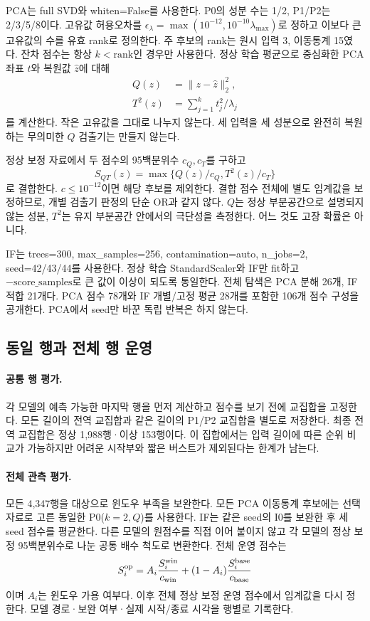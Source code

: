 \documentclass{article}
\begin{document}
PCA는 full SVD와 whiten=False를 사용한다. P0의 성분 수는 1/2, P1/P2는 2/3/5/8이다. 고유값 허용오차를 $\epsilon_\lambda=\max(10^{-12},10^{-10}\lambda_{\max})$로 정하고 이보다 큰 고유값의 수를 유효 rank로 정의한다. 주 후보의 rank는 원시 입력 3, 이동통계 15였다. 잔차 점수는 항상 $k<\mathrm{rank}$인 경우만 사용한다. 정상 학습 평균으로 중심화한 PCA 좌표 $t$와 복원값 $\hat z$에 대해
\begin{align}
Q(z)&=\|z-\hat z\|_2^2,\\
T^2(z)&=\sum_{j=1}^{k}t_j^2/\lambda_j
\end{align}
를 계산한다. 작은 고유값을 그대로 나누지 않는다. 세 입력을 세 성분으로 완전히 복원하는 무의미한 $Q$ 검출기는 만들지 않는다.

정상 보정 자료에서 두 점수의 95백분위수 $c_Q,c_T$를 구하고
\begin{equation}
S_{QT}(z)=\max\{Q(z)/c_Q,T^2(z)/c_T\}
\end{equation}
로 결합한다. $c\leq10^{-12}$이면 해당 후보를 제외한다. 결합 점수 전체에 별도 임계값을 보정하므로, 개별 검출기 판정의 단순 OR과 같지 않다. $Q$는 정상 부분공간으로 설명되지 않는 성분, $T^2$는 유지 부분공간 안에서의 극단성을 측정한다. 어느 것도 고장 확률은 아니다.

IF는 trees=300, max\_samples=256, contamination=auto, n\_jobs=2, seed=42/43/44를 사용한다. 정상 학습 StandardScaler와 IF만 fit하고 $-\text{score\_samples}$로 큰 값이 이상이 되도록 통일한다. 전체 탐색은 PCA 분해 26개, IF 적합 21개다. PCA 점수 78개와 IF 개별/고정 평균 28개를 포함한 106개 점수 구성을 공개한다. PCA에서 seed만 바꾼 독립 반복은 하지 않는다.

\subsection{동일 행과 전체 행 운영}
\paragraph{공통 행 평가.}
각 모델의 예측 가능한 마지막 행을 먼저 계산하고 점수를 보기 전에 교집합을 고정한다. 모든 길이의 전역 교집합과 같은 길이의 P1/P2 교집합을 별도로 저장한다. 최종 전역 교집합은 정상 1,988행·이상 153행이다. 이 집합에서는 입력 길이에 따른 순위 비교가 가능하지만 어려운 시작부와 짧은 버스트가 제외된다는 한계가 남는다.

\paragraph{전체 관측 평가.}
모든 4,347행을 대상으로 윈도우 부족을 보완한다. 모든 PCA 이동통계 후보에는 선택 자료로 고른 동일한 P0($k=2,Q$)를 사용한다. IF는 같은 seed의 I0를 보완한 후 세 seed 점수를 평균한다. 다른 모델의 원점수를 직접 이어 붙이지 않고 각 모델의 정상 보정 95백분위수로 나눈 공통 배수 척도로 변환한다. 전체 운영 점수는
\begin{equation}
S_i^{\rm op}=A_i\frac{S_i^{\rm win}}{c_{\rm win}}+(1-A_i)\frac{S_i^{\rm base}}{c_{\rm base}}
\label{eq:op}
\end{equation}
이며 $A_i$는 윈도우 가용 여부다. 이후 전체 정상 보정 운영 점수에서 임계값을 다시 정한다. 모델 경로·보완 여부·실제 시작/종료 시각을 행별로 기록한다.
\end{document}
